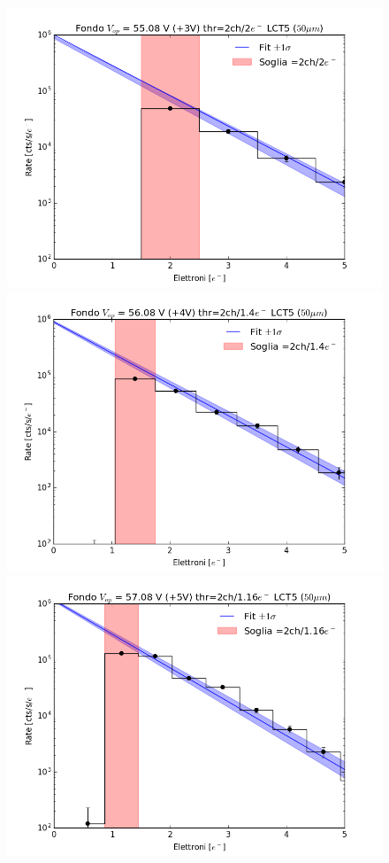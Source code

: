 \documentclass[10pt,a4paper, openany]{book}
\begin{document}
\begin{figure}[!h]
\begin{center}
\includegraphics[scale=0.25]{imm/fit3_2.png}
\includegraphics[scale=0.25]{imm/fit4_2.png}
\includegraphics[scale=0.25]{imm/fit5_2.png}

\end{center}
\end{figure}
\end{document}
